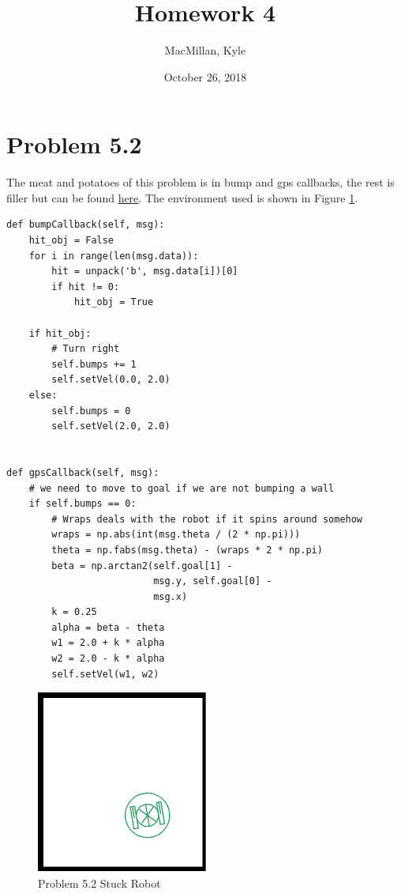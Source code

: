\documentclass{article}
\title{\textbf{Homework 4}}
\author{MacMillan, Kyle}
\date{October 26, 2018}
\begin{document}
\maketitle

\newpage
\tableofcontents
{}
\newpage
\listoffigures
{}



\newpage
\hypersetup{
    colorlinks,
    citecolor=blue,
    filecolor=black,
    linkcolor=blue,
    urlcolor=blue
}

\setcounter{page}{1}
\newpage
\section{\textbf{Problem 5.2}}
The meat and potatoes of this problem is in bump and gps callbacks, the 
rest is filler but can be found \href{https://github.com/macattackftw/RoboticsHW/blob/master/HW4/Problem2.py}{here}. The environment used is shown in Figure \ref{fig:stuck1}.

\begin{verbatim}
def bumpCallback(self, msg):
    hit_obj = False
    for i in range(len(msg.data)):
        hit = unpack('b', msg.data[i])[0]
        if hit != 0:
            hit_obj = True

    if hit_obj:
        # Turn right
        self.bumps += 1
        self.setVel(0.0, 2.0)
    else:
        self.bumps = 0
        self.setVel(2.0, 2.0)


def gpsCallback(self, msg):
    # we need to move to goal if we are not bumping a wall
    if self.bumps == 0:
        # Wraps deals with the robot if it spins around somehow
        wraps = np.abs(int(msg.theta / (2 * np.pi)))
        theta = np.fabs(msg.theta) - (wraps * 2 * np.pi)
        beta = np.arctan2(self.goal[1] -
                          msg.y, self.goal[0] -
                          msg.x)
        k = 0.25
        alpha = beta - theta
        w1 = 2.0 + k * alpha
        w2 = 2.0 - k * alpha
        self.setVel(w1, w2)

\end{verbatim}

\begin{figure}[h]
    \centering
    \includegraphics[pages=1]{stuck1}
    \caption{Problem 5.2 Stuck Robot}
    \label{fig:stuck1}
\end{figure}
\end{document}
